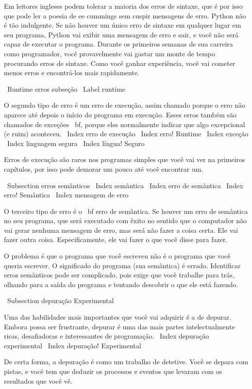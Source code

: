 \documentclass[10pt]{book}
\begin{document}
{Em leitores ingleses podem tolerar a maioria dos erros de sintaxe, que é por isso que
pode ler a poesia de ee cummings sem cuspir mensagens de erro.
Python não é tão indulgente. Se não houver um único erro de sintaxe
em qualquer lugar em seu programa, Python vai exibir uma mensagem de erro e sair,
e você não será capaz de executar o programa. Durante os primeiros
semanas de sua carreira como programador, você provavelmente vai gastar um monte de
tempo procurando erros de sintaxe. Como você ganhar experiência, você vai
cometer menos erros e encontrá-los mais rapidamente.

\ {Runtime erros} subseção
\ Label {} runtime

O segundo tipo de erro é um erro de execução, assim chamado porque o
erro não aparece até depois o início do programa em execução.
Esses erros também são chamados de exceções {\ bf}, porque eles normalmente
indicar que algo excepcional (e ruim) aconteceu.
\ Index {erro de execução}
\ Index {erro! Runtime}
\ Index {exceção}
\ Index {linguagem segura}
\ Index {língua! Seguro}

Erros de execução são raros nos programas simples que você vai ver na
primeiros capítulos, por isso pode demorar um pouco até você encontrar um.


\ Subsection {erros semânticos}
\ Index {} semântica
\ Index {erro de semântica}
\ Index {erro! Semântica}
\ Index {mensagem de erro}

O terceiro tipo de erro é o {\ bf erro de semântica}. Se houver um
erro de semântica no seu programa, que será executado com êxito no sentido
que o computador não vai gerar nenhuma mensagem de erro, mas será
não fazer a coisa certa. Ele vai fazer outra coisa. Especificamente, ele
vai fazer o que você disse para fazer.

O problema é que o programa que você escreveu não é o programa que você
queria escrever. O significado do programa (sua semântica) é errado.
Identificar erros semânticos pode ser complicado, pois exige que você trabalhe
para trás, olhando para a saída do programa e tentando descobrir
o que ele está fazendo.

\ Subsection {depuração Experimental}

Uma das habilidades mais importantes que você vai adquirir é a de depurar.
Embora possa ser frustrante, depurar é uma das mais
partes intelectualmente ricas, desafiadoras e interessantes de
programação.
\ Index {depuração experimental}
\ Index {depuração! Experimental}

De certa forma, a depuração é como um trabalho de detetive. Você se depara
com pistas, e você tem que deduzir os processos e eventos que levaram
com os resultados que você vê.

}
\end{document}
